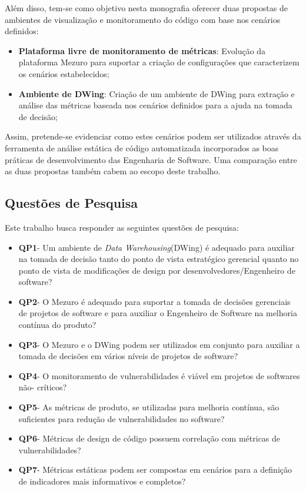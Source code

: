 %

Além disso, tem-se como objetivo nesta monografia oferecer duas propostas de ambientes de visualização e monitoramento do código com base nos cenários definidos:
\begin{itemize}
\item \textbf{Plataforma livre de monitoramento de métricas}: Evolução da plataforma Mezuro para suportar a criação de configurações que caracterizem os cenários estabelecidos;
\item \textbf{Ambiente de DWing}: Criação de um ambiente de DWing para extração e análise das métricas baseada nos cenários definidos para a ajuda na tomada de decisão;
\end{itemize}

Assim, pretende-se evidenciar como estes cenários podem ser utilizados através da ferramenta de análise estática de código automatizada incorporados as boas práticas de desenvolvimento das Engenharia de Software. Uma comparação entre as duas propostas também cabem ao escopo deste trabalho.

%

\subsection{Questões de Pesquisa}

%

Este trabalho busca responder as seguintes questões de pesquisa:

%

\begin{itemize}
\item \textbf{QP1}- Um ambiente de \emph{Data Warehousing}(DWing) é  adequado para auxiliar na tomada de decisão tanto do ponto de vista estratégico gerencial quanto no ponto de vista de modificações de design por desenvolvedores/Engenheiro de software?
\item \textbf{QP2}- O Mezuro é adequado para suportar a tomada de decisões gerenciais de projetos de software e para auxiliar o Engenheiro de Software na melhoria contínua do produto?
\item \textbf{QP3}- O Mezuro e o DWing podem ser utilizados em conjunto para auxiliar a tomada de decisões em vários níveis de projetos de software?
\item \textbf{QP4}- O monitoramento de vulnerabilidades é viável em projetos de softwares não- críticos?
\item \textbf{QP5}- As métricas de produto, se utilizadas para melhoria contínua, são suficientes para redução de vulnerabilidades no software?
\item \textbf{QP6}- Métricas de design de código possuem correlação com métricas de vulnerabilidades?
\item \textbf{QP7}- Métricas estáticas podem ser compostas em cenários para a definição de indicadores mais informativos e completos?
\end{itemize}


